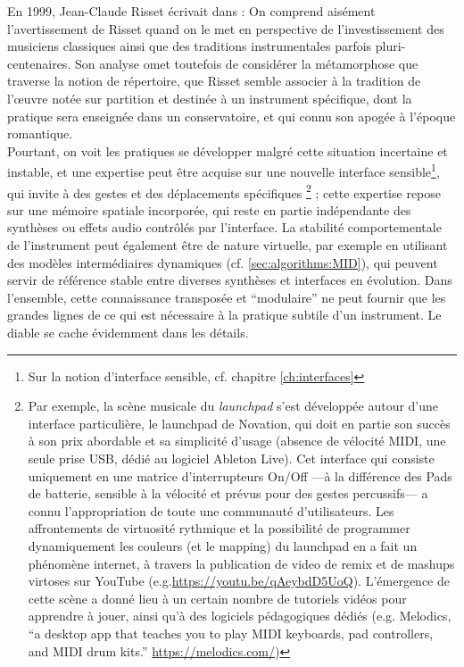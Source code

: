 \indent En 1999, Jean-Claude Risset écrivait dans \cite{genevois_les_1999} :  On comprend aisément l'avertissement de Risset quand on le met en perspective de l'investissement des musiciens classiques ainsi que des traditions instrumentales parfois pluri-centenaires. Son analyse omet toutefois de considérer la métamorphose que traverse la notion de répertoire, que Risset semble associer à la tradition de l'œuvre notée sur partition et destinée à un instrument spécifique, dont la pratique sera enseignée dans un conservatoire, et qui connu son apogée à l'époque romantique.\\
\noindent Pourtant, on voit les pratiques se développer malgré cette situation incertaine et instable, et une expertise peut être acquise sur une nouvelle interface sensible\footnote{Sur la notion d'interface sensible, cf. chapitre \ref{ch:interfaces}}, qui invite à des gestes et des déplacements spécifiques \footnote{Par exemple, la scène musicale du \textit{launchpad} s'est développée autour d'une interface particulière, le launchpad de Novation, qui doit en partie son succès à son prix abordable et sa simplicité d'usage (absence de vélocité \gls{MIDI}, une seule prise \gls{USB}, dédié au logiciel Ableton Live). Cet interface qui consiste uniquement en une matrice d'interrupteurs On/Off —à la différence des Pads de batterie, sensible à la vélocité et prévus pour des gestes percussifs— a connu l'appropriation de toute une communauté d'utilisateurs. Les affrontements de virtuosité rythmique et la possibilité de programmer dynamiquement les couleurs (et le mapping) du launchpad en a fait un phénomène internet, à travers la publication de video de remix et de mashups virtoses sur YouTube (e.g.\url{https://youtu.be/qAeybdD5UoQ}). L'émergence de cette scène a donné lieu à un certain nombre de tutoriels vidéos pour apprendre à jouer, ainsi qu'à des logiciels pédagogiques dédiés (e.g. Melodics, ``a desktop app that teaches you to play MIDI keyboards, pad controllers, and MIDI drum kits.'' \url{https://melodics.com/})} ; cette expertise repose sur une mémoire spatiale incorporée, qui reste en partie indépendante des synthèses ou effets audio contrôlés par l'interface. La stabilité comportementale de l'instrument peut également être de nature virtuelle, par exemple en utilisant des modèles intermédiaires dynamiques \cite{goudard_dynamic_2011} (cf. \ref{sec:algorithms:MID}), qui peuvent servir de référence stable entre diverses synthèses et interfaces en évolution.
\noindent Dans l'ensemble, cette connaissance transposée et ``modulaire'' ne peut fournir que les grandes lignes de ce qui est nécessaire à la pratique subtile d'un instrument. Le diable se cache évidemment dans les détails.


